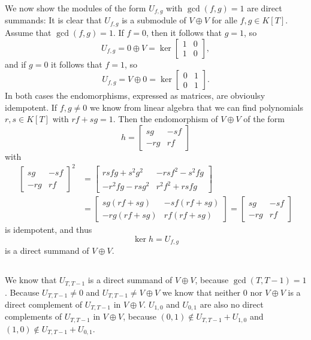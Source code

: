 \documentclass[a4paper,10pt]{article}
\theoremstyle{definition}
\newcommand{\bvect}[1]{\begin{bmatrix}#1\end{bmatrix}}
\begin{document}
We now show the modules of the form $U_{f,g}$ with $\gcd(f,g)=1$ are direct summands: It is clear that $U_{f,g}$ is a submodule of $V \oplus V$ for alle $f,g \in K[T]$. Assume that $\gcd(f,g)=1$. If $f=0$, then it follows that $g=1$, so
\[
 U_{f,g} = 0 \oplus V = \ker \bvect{1&0\\1&0},
\]
and if $g=0$ it follows that $f=1$, so
\[
 U_{f,g} = V \oplus 0 = \ker \bvect{0&1\\0&1}.
\]
In both cases the endomorphisms, expressed as matrices, are obvioulsy idempotent.
If $f,g \neq 0$ we know from linear algebra that we can find polynomials $r,s\in K[T]$ with $rf + sg = 1$. Then the endomorphism of $V \oplus V$ of the form
\[
 h = 
 \begin{bmatrix}
   sg & -sf \\
  -rg &  rf
 \end{bmatrix}
\]
with
\begin{align*}
 \begin{bmatrix}
   sg & -sf \\
  -rg &  rf
 \end{bmatrix}^2
 &=
 \begin{bmatrix}
  rsfg + s^2g^2 & -rsf^2-s^2fg \\
 -r^2fg - rsg^2 & r^2 f^2 + rsfg
 \end{bmatrix} \\
 &=
 \begin{bmatrix}
  sg(rf+sg) & -sf(rf+sg) \\
 -rg(rf+sg) & rf(rf+sg)
 \end{bmatrix}
 =
 \begin{bmatrix}
   sg & -sf \\
  -rg &  rf
 \end{bmatrix}
\end{align*}
is idempotent, and thus
\[
 \ker h = U_{f,g}
\]
is a direct summand of $V \oplus V$.


\subsection{}
We know that $U_{T,T-1}$ is a direct summand of $V \oplus V$, because  $\gcd(T,T-1)=1$. Because $U_{T,T-1} \neq 0$ and $U_{T,T-1} \neq V \oplus V$ we know that neither $0$ nor $V \oplus V$ is a direct complement of $U_{T,T-1}$ in $V \oplus V$. $U_{1,0}$ and $U_{0,1}$ are also no direct complements of $U_{T,T-1}$ in $V \oplus V$, because $(0,1) \not\in U_{T,T-1} + U_{1,0}$ and $(1,0) \not\in U_{T,T-1} + U_{0,1}$.
\end{document}
